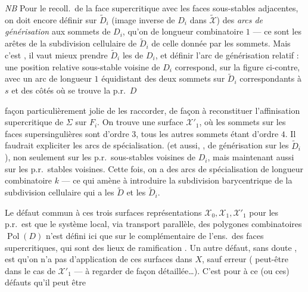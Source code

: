 \documentclass[11pt,a4paper]{article}
\begin{document}
\emph{NB} Pour le recoll.\ de la face supercritique avec les faces sous-stables adjacentes, on doit encore définir sur $\widetilde{D}_i$ (image inverse de $D_i$ dans $\widetilde{\mathcal{X}}$) des \struck{\ill{}} \emph{arcs de générisation} \struck{\ill{}} \ill{} aux sommets de $D_i$, qu'on  de longueur combinatoire $1$ --- ce sont  les arêtes de la subdivision cellulaire de $\widetilde{D}_i$  de celle donnée par les sommets. Mais c'est , il vaut mieux prendre $\widetilde{D}_i$ \ill{} les  de $D_i$, et définir l'arc de générisation relatif : une position relative sous-stable voisine de $D_i$ correspond, sur la figure ci-contre, avec un arc de longueur $1$ équidistant des deux sommets sur $\widetilde{D}_i$ correspondants à $s$ et des côtés où se trouve la p.r.\ $D$

façon particulièrement jolie de les raccorder, de façon à reconstituer \struck{\ill{}} l'affinisation supercritique de $\Sigma$ sur $F_i$. On trouve une surface $\mathcal{X}'_1$, où les sommets  sur les faces supersingulières sont d'ordre $3$, tous les autres sommets étant d'ordre $4$. Il faudrait expliciter les arcs de spécialisation. (et aussi, , de générisation sur les $\widetilde{D}_i$), non seulement sur les p.r.\ sous-stables voisines de $D_i$, mais maintenant aussi sur les p.r.\ stables voisines. Cette fois, on a des arcs de spécialisation de longueur combinatoire $k$ --- ce qui amène à introduire la subdivision barycentrique  de la subdivision cellulaire qui a les $\widetilde{D}$ et les $\widetilde{D}_i$. 

Le défaut commun  à ces trois surfaces représentations $\mathcal{X}_0, \mathcal{X}_1, \mathcal{X}'_1$ pour les p.r.\ est que le système local, via transport parallèle, des \struck{\ill{}} polygones combinatoires $\operatorname{Pol}(D)$ n'est défini ici que sur le complémentaire de l'ens.\ des  faces supercritiques, qui sont des lieux de ramification . Un autre défaut, sans doute , est qu'on n'a pas d'application  de ces surfaces dans $X$, sauf erreur ( peut-être dans le cas de $\mathcal{X}'_1$ --- \struck{\ill{}} à regarder de façon  détaillée\ldots). C'est pour  à ce (ou ces) défauts qu'il peut être
\end{document}
